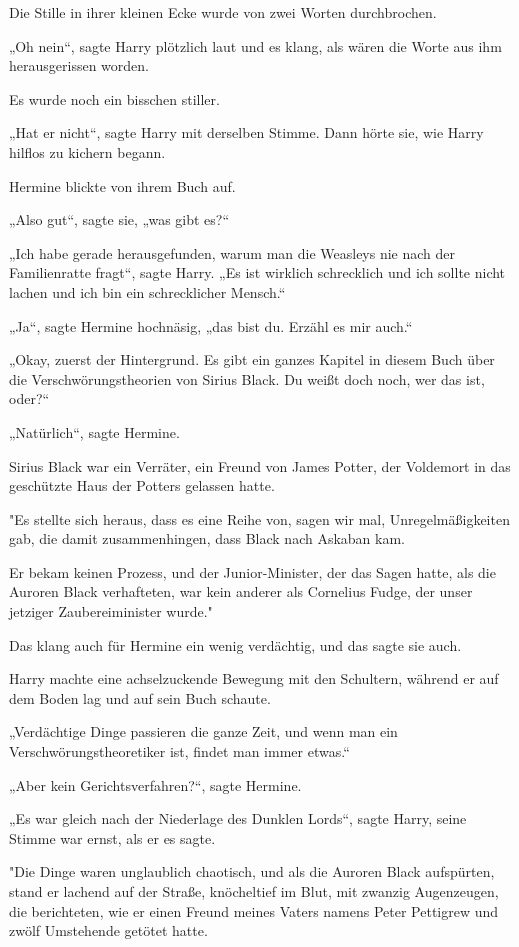 {Die Stille in ihrer kleinen Ecke wurde von zwei Worten durchbrochen.

„Oh nein“, sagte Harry plötzlich laut und es klang, als wären die Worte aus ihm herausgerissen worden.

Es wurde noch ein bisschen stiller.

„Hat er nicht“, sagte Harry mit derselben Stimme. Dann hörte sie, wie Harry hilflos zu kichern begann.

Hermine blickte von ihrem Buch auf.

„Also gut“, sagte sie, „was gibt es?“

„Ich habe gerade herausgefunden, warum man die Weasleys nie nach der Familienratte fragt“, sagte Harry. „Es ist wirklich schrecklich und ich sollte nicht lachen und ich bin ein schrecklicher Mensch.“

„Ja“, sagte Hermine hochnäsig, „das bist du. Erzähl es mir auch.“

„Okay, zuerst der Hintergrund. Es gibt ein ganzes Kapitel in diesem Buch über die Verschwörungstheorien von Sirius Black. Du weißt doch noch, wer das ist, oder?“

„Natürlich“, sagte Hermine.

Sirius Black war ein Verräter, ein Freund von James Potter, der Voldemort in das geschützte Haus der Potters gelassen hatte.

"Es stellte sich heraus, dass es eine Reihe von, sagen wir mal, Unregelmäßigkeiten gab, die damit zusammenhingen, dass Black nach Askaban kam.

Er bekam keinen Prozess, und der Junior-Minister, der das Sagen hatte, als die Auroren Black verhafteten, war kein anderer als Cornelius Fudge, der unser jetziger Zaubereiminister wurde."

Das klang auch für Hermine ein wenig verdächtig, und das sagte sie auch.

Harry machte eine achselzuckende Bewegung mit den Schultern, während er auf dem Boden lag und auf sein Buch schaute.

„Verdächtige Dinge passieren die ganze Zeit, und wenn man ein Verschwörungstheoretiker ist, findet man immer etwas.“

„Aber kein Gerichtsverfahren?“, sagte Hermine.

„Es war gleich nach der Niederlage des Dunklen Lords“, sagte Harry, seine Stimme war ernst, als er es sagte.

"Die Dinge waren unglaublich chaotisch, und als die Auroren Black aufspürten, stand er lachend auf der Straße, knöcheltief im Blut, mit zwanzig Augenzeugen, die berichteten, wie er einen Freund meines Vaters namens Peter Pettigrew und zwölf Umstehende getötet hatte.

}
